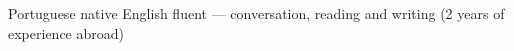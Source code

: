 \begin{cvskills}
  \cvskill
    {Portuguese}
    {native}
  \cvskill
    {English}
    {fluent — conversation, reading and writing (2 years of experience abroad)}
\end{cvskills}
